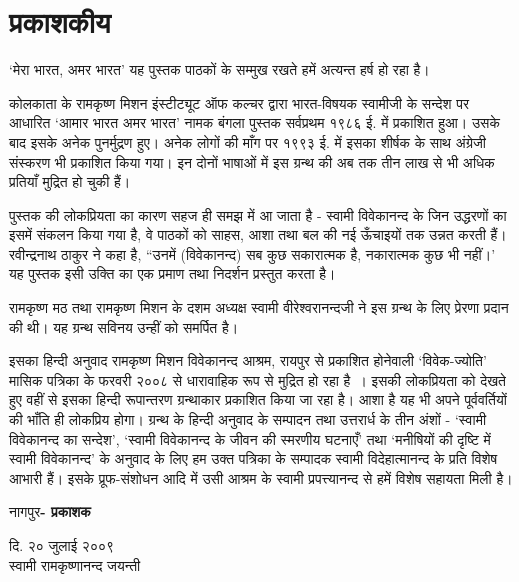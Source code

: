 
\newpage

\begin{center}
\dedication{\textbf{स्वामी वीरेश्वरानन्दजी की\general{\\[5pt]} स्मृति में समर्पित }}
\end{center}

\newpage

\chapter*{प्रकाशकीय }

‘मेरा भारत, अमर भारत’ यह पुस्तक पाठकों के सम्मुख रखते हमें अत्यन्त हर्ष हो रहा है। 

कोलकाता के रामकृष्ण मिशन इंस्टीट्यूट ऑफ कल्चर द्वारा भारत-विषयक स्वामीजी के सन्देश पर आधारित ‘आमार भारत अमर भारत’ नामक बंगला पुस्तक सर्वप्रथम १९८६ ई. में प्रकाशित हुआ। उसके बाद इसके अनेक पुनर्मुद्रण हुए। अनेक लोगों की माँग पर १९९३ ई. में इसका  शीर्षक के साथ अंग्रेजी संस्करण भी प्रकाशित किया गया। इन दोनों भाषाओं में इस ग्रन्थ की अब तक तीन लाख से भी अधिक प्रतियाँ मुद्रित हो चुकी हैं। 

पुस्तक की लोकप्रियता का कारण सहज ही समझ में आ जाता है - स्वामी विवेकानन्द के जिन उद्धरणों का इसमें संकलन किया गया है, वे पाठकों को साहस, आशा तथा बल की नई ऊँचाइयों तक उन्नत करती हैं। रवीन्द्रनाथ ठाकुर ने कहा है, “उनमें (विवेकानन्द) सब कुछ सकारात्मक है, नकारात्मक कुछ भी नहीं।’ यह पुस्तक इसी उक्ति का एक प्रमाण तथा निदर्शन प्रस्तुत करता है। 

रामकृष्ण मठ तथा रामकृष्ण मिशन के दशम अध्यक्ष स्वामी वीरेश्वरानन्दजी ने इस ग्रन्थ के लिए प्रेरणा प्रदान की थी। यह ग्रन्थ सविनय उन्हीं को समर्पित है। 

इसका हिन्दी अनुवाद रामकृष्ण मिशन विवेकानन्द आश्रम, रायपुर से प्रकाशित होनेवाली ‘विवेक-ज्योति’ मासिक पत्रिका के फरवरी २००८ से धारावाहिक रूप से मुद्रित हो रहा है~। इसकी लोकप्रियता को देखते हुए वहीं से इसका हिन्दी रूपान्तरण ग्रन्थाकार प्रकाशित किया जा रहा है। आशा है यह भी अपने पूर्ववर्तियों की भाँति ही लोकप्रिय होगा। ग्रन्थ के हिन्दी अनुवाद के सम्पादन तथा उत्तरार्ध के तीन अंशों - ‘स्वामी विवेकानन्द का सन्देश’, ‘स्वामी विवेकानन्द के जीवन की स्मरणीय घटनाएँ’ तथा ‘मनीषियों की दृष्टि में स्वामी विवेकानन्द’ के अनुवाद के लिए हम उक्त पत्रिका के सम्पादक स्वामी विदेहात्मानन्द के प्रति विशेष आभारी हैं। इसके प्रूफ-संशोधन आदि में उसी आश्रम के स्वामी प्रपत्त्यानन्द से हमें विशेष सहायता मिली है। 

\bigskip

\noindent नागपुर\hfill{\large\textbf{- प्रकाशक}}

\noindent दि. २० जुलाई २००९\\स्वामी रामकृष्णानन्द जयन्ती 


